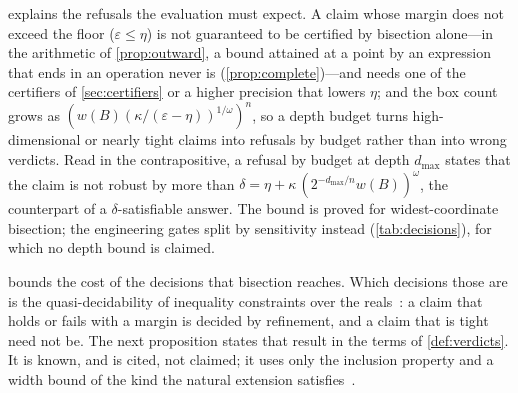 \documentclass[preprint,11pt,a4paper]{elsarticle}
\theoremstyle{definition}
\begin{document}
 explains the refusals the evaluation must expect. A claim whose margin does not exceed the floor ($\varepsilon\le\eta$) is not guaranteed to be certified by bisection alone---in the arithmetic of \cref{prop:outward}, a bound attained at a point by an expression that ends in an operation never is (\cref{prop:complete})---and needs one of the certifiers of \cref{sec:certifiers} or a higher precision that lowers $\eta$; and the box count grows as $(w(B)(\kappa/(\varepsilon-\eta))^{1/\omega})^{n}$, so a depth budget turns high-dimensional or nearly tight claims into refusals by budget rather than into wrong verdicts. Read in the contrapositive, a refusal by budget at depth $d_{\max}$ states that the claim is not robust by more than $\delta=\eta+\kappa\,(2^{-d_{\max}/n}w(B))^{\omega}$, the counterpart of a $\delta$-satisfiable answer. The bound is proved for widest-coordinate bisection; the engineering gates split by sensitivity instead (\cref{tab:decisions}), for which no depth bound is claimed.

 bounds the cost of the decisions that bisection reaches. Which decisions those are is the quasi-decidability of inequality constraints over the reals~\citep{Ratschan06}: a claim that holds or fails with a margin is decided by refinement, and a claim that is tight need not be. The next proposition states that result in the terms of \cref{def:verdicts}. It is known, and is cited, not claimed; it uses only the inclusion property and a width bound of the kind the natural extension satisfies~\citep{Moore09,Neumaier90}.
\end{document}
